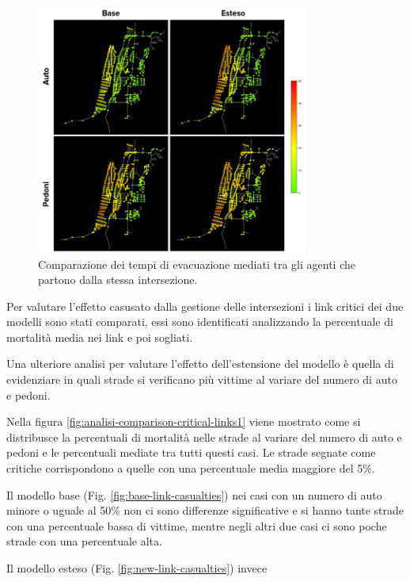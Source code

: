 \begin{figure}[h]
    \centering
    \includegraphics[width=0.8\textwidth]{images/analisi/comparison-evtimes-map.png}
    \caption{Comparazione dei tempi di evacuazione mediati tra gli agenti che partono dalla stessa intersezione. }
    \label{fig:analisi-comparison-ev-times-map}
\end{figure}

\pagebreak

Per valutare l'effetto casusato dalla gestione delle intersezioni i link critici dei due modelli sono stati comparati,
essi sono identificati analizzando la percentuale di mortalità media nei link e poi sogliati.

Una ulteriore analisi per valutare l'effetto dell'estensione del modello è quella di evidenziare in quali strade si verificano 
più vittime al variare del numero di auto e pedoni. 

Nella figura \ref{fig:analisi-comparison-critical-links1} viene mostrato come si distribusce la percentuali di mortalità nelle strade 
al variare del numero di auto e pedoni e le percentuali mediate tra tutti questi casi. 
Le strade segnate come critiche corrispondono a quelle con una percentuale media maggiore del 5\%.

Il modello base (Fig. \ref{fig:base-link-casualties}) nei casi con un numero di auto minore o uguale al 50\%
non ci sono differenze significative e si hanno tante strade con una percentuale bassa di vittime, 
mentre negli altri due casi ci sono poche strade con una percentuale alta.

Il modello esteso (Fig. \ref{fig:new-link-casualties}) invece %


